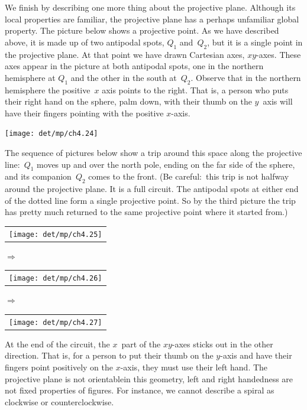 We finish by describing one more thing about the projective plane. 
Although its local properties are familiar, the projective plane has
a perhaps unfamiliar global property.
The picture below shows a projective point.
As we have described above, it is made up of two antipodal spots,
$Q_1$ and~$Q_2$, but it is a single point in the projective plane.
At that point we have drawn Cartesian axes, $xy$-axes.
These axes appear in the picture at both antipodal spots, 
one in the northern hemisphere at $Q_1$ and the other in the
south at~$Q_2$.
Observe that
in the northern hemisphere the positive~$x$ axis points to the right.
That is, a person who puts 
their right hand on the sphere, palm down, with their thumb on the
$y$~axis will have their fingers pointing with the positive $x$-axis.
\begin{center}
  \texttt{[image: det/mp/ch4.24]}
\end{center}
The sequence of pictures below 
show a trip around this space along the projective line:~$Q_1$ 
moves up and over the north pole, ending on the
far side of the sphere, and its companion~$Q_2$ comes to the front.
(Be careful:~this trip is not halfway around the projective plane.
It is a full circuit.
The antipodal spots at either end of the dotted line form a single 
projective point.
So by the third picture the trip has pretty much returned 
to the same projective point where it started from.) 
\begin{center}
  \begin{tabular}{@{}c@{}}\texttt{[image: det/mp/ch4.25]}\end{tabular}
\qquad\mbox{$\Longrightarrow$}\qquad
  \begin{tabular}{@{}c@{}}\texttt{[image: det/mp/ch4.26]}\end{tabular}
\qquad\mbox{$\Longrightarrow$}\qquad
  \begin{tabular}{@{}c@{}}\texttt{[image: det/mp/ch4.27]}\end{tabular}
\end{center}
At the end of the circuit, 
the $x$~part of the $xy$-axes sticks out in the other direction.
That is, for a person to put their thumb on the $y$-axis and 
have their fingers point positively on the $x$-axis, they must
use their left hand.
The projective plane is not orientable\Dash in this geometry,
left and right handedness are not fixed properties of figures.
For instance, 
we cannot describe a spiral as clockwise or
counterclockwise.

